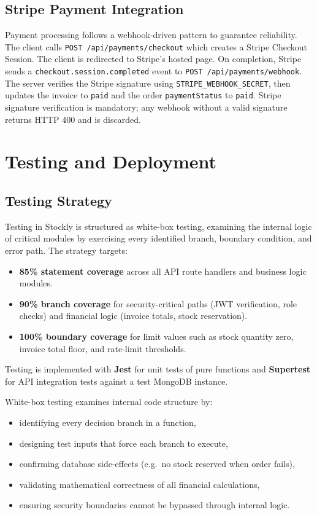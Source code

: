 \documentclass[12pt,a4paper]{report}
\begin{document}
\section{Stripe Payment Integration}

Payment processing follows a webhook-driven pattern to guarantee reliability. The client calls \texttt{POST /api/payments/checkout} which creates a Stripe Checkout Session. The client is redirected to Stripe's hosted page. On completion, Stripe sends a \texttt{checkout.session.completed} event to \texttt{POST /api/payments/webhook}. The server verifies the Stripe signature using \texttt{STRIPE\_WEBHOOK\_SECRET}, then updates the invoice to \texttt{paid} and the order \texttt{paymentStatus} to \texttt{paid}. Stripe signature verification is mandatory; any webhook without a valid signature returns HTTP 400 and is discarded.

\chapter{Testing and Deployment}

\section{Testing Strategy}

Testing in Stockly is structured as white-box testing, examining the internal logic of critical modules by exercising every identified branch, boundary condition, and error path. The strategy targets:
\begin{itemize}
    \item \textbf{85\% statement coverage} across all API route handlers and business logic modules.
    \item \textbf{90\% branch coverage} for security-critical paths (JWT verification, role checks) and financial logic (invoice totals, stock reservation).
    \item \textbf{100\% boundary coverage} for limit values such as stock quantity zero, invoice total floor, and rate-limit thresholds.
\end{itemize}

Testing is implemented with \textbf{Jest} for unit tests of pure functions and \textbf{Supertest} for API integration tests against a test MongoDB instance.

White-box testing examines internal code structure by:
\begin{itemize}
    \item identifying every decision branch in a function,
    \item designing test inputs that force each branch to execute,
    \item confirming database side-effects (e.g.\ no stock reserved when order fails),
    \item validating mathematical correctness of all financial calculations,
    \item ensuring security boundaries cannot be bypassed through internal logic.
\end{itemize}
\end{document}
